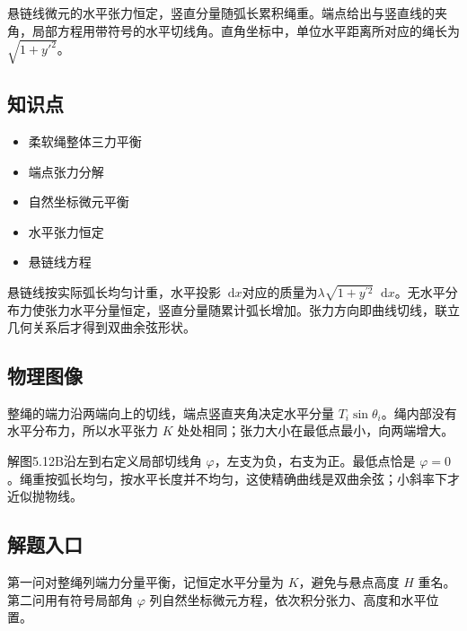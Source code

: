 \documentclass[UTF8,fontset=fandol,a4paper,11pt]{ctexart}
\providecommand{\tightlist}{\setlength{\itemsep}{0pt}\setlength{\parskip}{0pt}}
\newcommand{\dd}{\mathop{}\!\mathrm{d}}
\begin{document}
悬链线微元的水平张力恒定，竖直分量随弧长累积绳重。端点给出与竖直线的夹角，局部方程用带符号的水平切线角。直角坐标中，单位水平距离所对应的绳长为 $\sqrt{1+y'^2}$。



\subsection*{知识点}

\begin{itemize}
\tightlist
\item
  柔软绳整体三力平衡
\item
  端点张力分解
\item
  自然坐标微元平衡
\item
  水平张力恒定
\item
  悬链线方程
\end{itemize}

悬链线按实际弧长均匀计重，水平投影$\dd x$对应的质量为$\lambda\sqrt{1+y^{\prime2}}\dd x$。无水平分布力使张力水平分量恒定，竖直分量随累计弧长增加。张力方向即曲线切线，联立几何关系后才得到双曲余弦形状。




\subsection*{物理图像}

整绳的端力沿两端向上的切线，端点竖直夹角决定水平分量 $T_i\sin\theta_i$。绳内部没有水平分布力，所以水平张力 $K$ 处处相同；张力大小在最低点最小，向两端增大。

解图5.12B沿左到右定义局部切线角 $\varphi$，左支为负，右支为正。最低点恰是 $\varphi=0$。绳重按弧长均匀，按水平长度并不均匀，这使精确曲线是双曲余弦；小斜率下才近似抛物线。



\subsection*{解题入口}

第一问对整绳列端力分量平衡，记恒定水平分量为 $K$，避免与悬点高度 $H$ 重名。第二问用有符号局部角 $\varphi$ 列自然坐标微元方程，依次积分张力、高度和水平位置。
\end{document}
